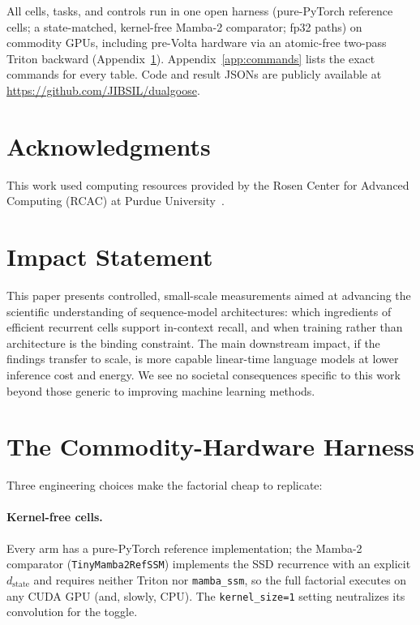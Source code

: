 \documentclass{article}
\newcommand{\dstate}{d_{\mathrm{state}}}
\begin{document}
All cells, tasks, and controls run in one open harness (pure-PyTorch reference cells; a state-matched, kernel-free Mamba-2 comparator; fp32 paths) on commodity GPUs, including pre-Volta hardware via an atomic-free two-pass Triton backward (Appendix~\ref{app:harness}). Appendix~\ref{app:commands} lists the exact commands for every table. Code and result JSONs are publicly available at \url{https://github.com/JIBSIL/dualgoose}.

\section*{Acknowledgments}
This work used computing resources provided by the Rosen Center for Advanced Computing (RCAC) at Purdue University~\citep{McCartney2014}.

\section*{Impact Statement}

This paper presents controlled, small-scale measurements aimed at advancing the scientific understanding of sequence-model architectures: which ingredients of efficient recurrent cells support in-context recall, and when training rather than architecture is the binding constraint. The main downstream impact, if the findings transfer to scale, is more capable linear-time language models at lower inference cost and energy. We see no societal consequences specific to this work beyond those generic to improving machine learning methods.




\newpage
\appendix
\onecolumn

\section{The Commodity-Hardware Harness}\label{app:harness}

Three engineering choices make the factorial cheap to replicate:

\paragraph{Kernel-free cells.} Every arm has a pure-PyTorch reference implementation; the Mamba-2 comparator (\texttt{TinyMamba2RefSSM}) implements the SSD recurrence with an explicit $\dstate$ and requires neither Triton nor \texttt{mamba\_ssm}, so the full factorial executes on any CUDA GPU (and, slowly, CPU). The \texttt{kernel\_size=1} setting neutralizes its convolution for the toggle.
\end{document}
